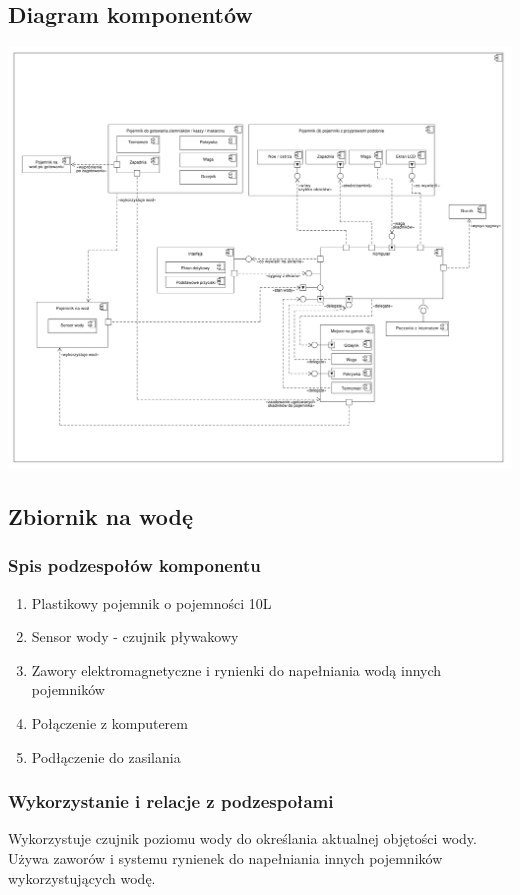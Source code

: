\documentclass[12pt,a4paper,notitlepage]{article}
\begin{document}
\subsection{Diagram komponentów}
\includegraphics[scale=0.16,width=\textwidth,height=\textheight,keepaspectratio=true]{Diagram_komponentow.pdf}
\newpage

\subsection{Zbiornik na wodę}
\subsubsection{Spis podzespołów komponentu}
\begin{enumerate}
  \item Plastikowy pojemnik o pojemności 10L
  \item Sensor wody - czujnik pływakowy
  \item Zawory elektromagnetyczne i rynienki do napełniania wodą innych pojemników
  \item Połączenie z komputerem
  \item Podłączenie do zasilania
\end{enumerate}

\subsubsection{Wykorzystanie i relacje z podzespołami}
Wykorzystuje czujnik poziomu wody do określania aktualnej objętości wody. Używa zaworów i systemu rynienek do napełniania innych pojemników wykorzystujących wodę. 
\end{document}
